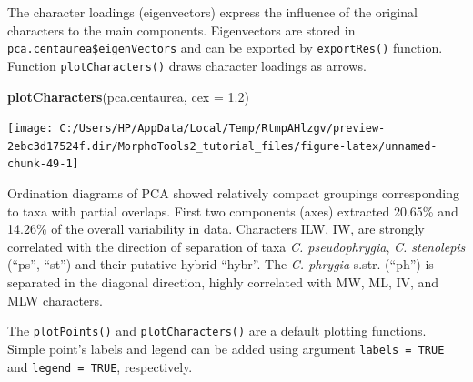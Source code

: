 \documentclass[
]{article}
\newenvironment{Shaded}{\begin{snugshade}}{\end{snugshade}}
\newcommand{\DataTypeTok}[1]{\textcolor[rgb]{0.13,0.29,0.53}{#1}}
\newcommand{\FloatTok}[1]{\textcolor[rgb]{0.00,0.00,0.81}{#1}}
\newcommand{\KeywordTok}[1]{\textcolor[rgb]{0.13,0.29,0.53}{\textbf{#1}}}
\newcommand{\NormalTok}[1]{#1}
\newcommand{\OperatorTok}[1]{\textcolor[rgb]{0.81,0.36,0.00}{\textbf{#1}}}
\newcommand{\StringTok}[1]{\textcolor[rgb]{0.31,0.60,0.02}{#1}}
\begin{document}
\begin{Shaded}
\end{Shaded}

The character loadings (eigenvectors) express the influence of the
original characters to the main components. Eigenvectors are stored in
\texttt{pca.centaurea\$eigenVectors} and can be exported by
\texttt{exportRes()} function. Function \texttt{plotCharacters()} draws
character loadings as arrows.

\begin{Shaded}
\begin{Highlighting}[]
\KeywordTok{plotCharacters}\NormalTok{(pca.centaurea, }\DataTypeTok{cex =} \FloatTok{1.2}\NormalTok{)}
\end{Highlighting}
\end{Shaded}

\begin{center}\texttt{[image: C:/Users/HP/AppData/Local/Temp/RtmpAHlzgv/preview-2ebc3d17524f.dir/MorphoTools2\_tutorial\_files/figure-latex/unnamed-chunk-49-1]} \end{center}

\begin{Shaded}
\end{Shaded}

Ordination diagrams of PCA showed relatively compact groupings
corresponding to taxa with partial overlaps. First two components (axes)
extracted 20.65\% and 14.26\% of the overall variability in data.
Characters ILW, IW, are strongly correlated with the direction of
separation of taxa \emph{C. pseudophrygia}, \emph{C. stenolepis}
(``ps'', ``st'') and their putative hybrid ``hybr''. The \emph{C.
phrygia} s.str. (``ph'') is separated in the diagonal direction, highly
correlated with MW, ML, IV, and MLW characters.

The \texttt{plotPoints()} and \texttt{plotCharacters()} are a default
plotting functions. Simple point's labels and legend can be added using
argument \texttt{labels\ =\ TRUE} and \texttt{legend\ =\ TRUE},
respectively.
\end{document}
